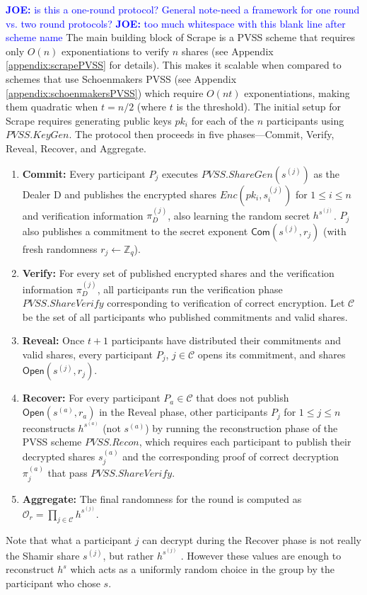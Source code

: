 \documentclass[letterpaper,twocolumn,10pt]{article}
\theoremstyle{definition}
\theoremstyle{remark}
\newcommand{\joenote}[1]{\textcolor{blue}{\textbf{JOE:} #1}}
\begin{document}
\joenote{is this a one-round protocol? General note-need a framework for one round vs. two round protocols?}
\joenote{too much whitespace with this blank line after scheme name}
The main building block of Scrape is a PVSS scheme that requires only $O(n)$ exponentiations to verify $n$ shares (see Appendix \ref{appendix:scrapePVSS} for details). This makes it scalable when compared to schemes that use Schoenmakers PVSS (see Appendix \ref{appendix:schoenmakersPVSS}) which require $O(n t)$ exponentiations, making them quadratic when $t = n/2$ (where $t$ is the threshold). The initial setup for Scrape requires generating public keys $pk_i$ for each of the $n$ participants using $PVSS.KeyGen$. 
  The protocol then proceeds in five phases---Commit, Verify, Reveal, Recover, and Aggregate.
\begin{enumerate}
\item \textbf{Commit:} Every participant $P_j$ executes $PVSS.ShareGen(s^{(j)})$ as the Dealer D and publishes the encrypted shares $Enc(pk_i, s^{(j)}_i)$ for $1 \le i \le n$ and verification information $\pi_D^{(j)}$, also learning the random secret $h^{s^{(j)}}$. $P_j$ also publishes a commitment to the secret exponent $\mathsf{Com}(s^{(j)}, r_j)$ (with fresh randomness $r_j \leftarrow \mathbb{Z}_q$).
\item \textbf{Verify:} For every set of published encrypted shares and the verification information $\pi_D^{(j)}$, all participants run the verification phase $PVSS.ShareVerify$ corresponding to verification of correct encryption. Let $\mathcal{C}$ be the set of all participants who published commitments and valid shares.
\item \textbf{Reveal:} Once $t+1$ participants have distributed their commitments and valid shares, every participant $P_j$, $j \in \mathcal{C}$ opens its commitment, and shares $\mathsf{Open}(s^{(j)}, r_j)$.
\item \textbf{Recover:} For every participant $P_a \in \mathcal{C}$ that does not publish $\mathsf{Open}(s^{(a)}, r_a)$ in the Reveal phase, other participants $P_j$ for $1 \leq j \leq n$ reconstructs $h^{s^{(a)}}$ (not $s^{(a)}$) by running the reconstruction phase of the PVSS scheme $PVSS.Recon$, which requires each participant to publish their decrypted shares $s_j^{(a)}$ and the corresponding proof of correct decryption $\pi_j^{(a)}$ that pass $PVSS.ShareVerify$.

\item \textbf{Aggregate:} The final randomness for the round is computed as $\mathcal{O}_r = \prod_{j \in \mathcal{C}} h^{s^{(j)}}$.
\end{enumerate}
Note that what a participant $j$ can decrypt during the Recover phase is not really the Shamir share $s^{(j)}$, but rather $h^{s^{(j)}}$ . However these values are enough to reconstruct $h^s$ which acts as a uniformly random choice in the group by the participant who chose $s$. \\
\end{document}
